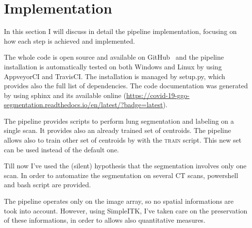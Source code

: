
	
	\section{Implementation}
	
	In this section I will discuss in detail the pipeline implementation, focusing on how each step is achieved and implemented.
	
	The whole code is open source and available on GitHub~\cite{REP:CTLungSeg} and the pipeline installation is automatically tested on both Windows and Linux by using AppveyorCI and TravisCI.  The installation is managed by setup.py, which provides also the full list of dependencies. The code documentation was generated by using sphinx and its available online (\url{https://covid-19-ggo-segmentation.readthedocs.io/en/latest/?badge=latest}). 
	
	The pipeline provides scripts to perform lung segmentation and labeling on a single scan. It provides also an already trained set of centroids. The pipeline allows also to train other set of centroids by with the \textsc{train} script. This new set can be used instead of the default one. 
	
	Till now I've used the (silent) hypothesis that the segmentation involves only one scan. In order to automatize the segmentation on several CT scans, powershell and bash script are provided.
	
	The pipeline operates only on the image array, so no spatial informations are took into account. However, using SimpleITK, I've taken care on the preservation of these informations, in order to allows also quantitative measures.
	

 
